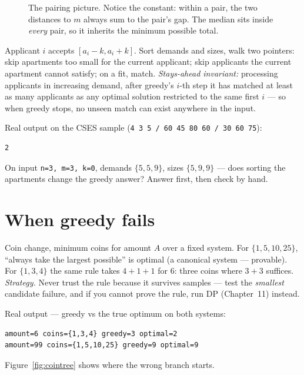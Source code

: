 \begin{figure}[ht]\centering

\caption{The pairing picture. Notice the constant: within a pair, the
two distances to $m$ always sum to the pair's gap. The median sits inside
\emph{every} pair, so it inherits the minimum possible total.}
\label{fig:median}
\end{figure}

\begin{example}
\label{ex:apts}
Applicant $i$ accepts $[a_i - k, a_i + k]$. Sort demands and sizes, walk
two pointers: skip apartments too small for the current applicant; skip
applicants the current apartment cannot satisfy; on a fit, match.
\emph{Stays-ahead invariant:} processing applicants in increasing demand,
after greedy's $i$-th step it has matched at least as many applicants as
any optimal solution restricted to the same first $i$ --- so when greedy
stops, no unseen match can exist anywhere in the input.

Real output on the CSES sample (\texttt{4 3 5 / 60 45 80 60 / 30 60 75}):
\begin{lstlisting}[numbers=none]
2
\end{lstlisting}
\end{example}

\begin{exercise}[easy]
On input \texttt{n=3, m=3, k=0}, demands $\{5,5,9\}$, sizes
$\{5,9,9\}$ --- does sorting the apartments change the greedy answer?
Answer first, then check by hand.
\end{exercise}

\section{When greedy fails}
\label{sec:fail}

\begin{example}
\label{ex:coins}
Coin change, minimum coins for amount $A$ over a fixed system. For
$\{1,5,10,25\}$, ``always take the largest possible'' is optimal (a
canonical system --- provable). For $\{1,3,4\}$ the same rule takes
$4+1+1$ for $6$: three coins where $3+3$ suffices.
\emph{Strategy.} Never trust the rule because it survives samples ---
test the \emph{smallest} candidate failure, and if you cannot prove the
rule, run DP (Chapter~11) instead.
\end{example}

Real output --- greedy vs the true optimum on both systems:
\begin{lstlisting}[numbers=none]
amount=6 coins={1,3,4} greedy=3 optimal=2
amount=99 coins={1,5,10,25} greedy=9 optimal=9
\end{lstlisting}
Figure~\ref{fig:cointree} shows where the wrong branch starts.

